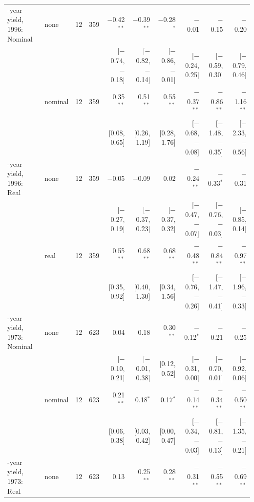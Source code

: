 \begin{table}[tp]
{\begin{tabular}{llcrrrrrrr}
\addlinespace
1-year yield, 1996: Nominal & none & 12 & 359 & $-$0.42$^{**}$ & $-$0.39$^{**}$ & $-$0.28$^{*}$ & $-$0.01 & $-$0.15 & $-$0.20\\
 & & & & {\scriptsize [$-$0.74, $-$0.18]} & {\scriptsize [$-$0.82, $-$0.14]} & {\scriptsize [$-$0.86, $-$0.01]} & {\scriptsize [$-$0.24, 0.25]} & {\scriptsize [$-$0.59, 0.30]} & {\scriptsize [$-$0.79, 0.46]}\\
 & nominal & 12 & 359 & 0.35$^{**}$ & 0.51$^{**}$ & 0.55$^{**}$ & $-$0.37$^{**}$ & $-$0.86$^{**}$ & $-$1.16$^{**}$\\
 & & & & {\scriptsize [0.08, 0.65]} & {\scriptsize [0.26, 1.19]} & {\scriptsize [0.28, 1.76]} & {\scriptsize [$-$0.68, $-$0.08]} & {\scriptsize [$-$1.48, $-$0.35]} & {\scriptsize [$-$2.33, $-$0.56]}\\
\addlinespace
1-year yield, 1996: Real & none & 12 & 359 & $-$0.05 & $-$0.09 & 0.02 & $-$0.24$^{**}$ & $-$0.33$^{*}$ & $-$0.31\\
 & & & & {\scriptsize [$-$0.27, 0.19]} & {\scriptsize [$-$0.37, 0.23]} & {\scriptsize [$-$0.37, 0.32]} & {\scriptsize [$-$0.47, $-$0.07]} & {\scriptsize [$-$0.76, $-$0.03]} & {\scriptsize [$-$0.85, 0.14]}\\
 & real & 12 & 359 & 0.55$^{**}$ & 0.68$^{**}$ & 0.68$^{**}$ & $-$0.48$^{**}$ & $-$0.84$^{**}$ & $-$0.97$^{**}$\\
 & & & & {\scriptsize [0.35, 0.92]} & {\scriptsize [0.40, 1.30]} & {\scriptsize [0.34, 1.56]} & {\scriptsize [$-$0.76, $-$0.26]} & {\scriptsize [$-$1.47, $-$0.41]} & {\scriptsize [$-$1.96, $-$0.33]}\\
\addlinespace
1-year yield, 1973: Nominal & none & 12 & 623 & 0.04 & 0.18 & 0.30$^{**}$ & $-$0.12$^{*}$ & $-$0.21 & $-$0.25\\
 & & & & {\scriptsize [$-$0.10, 0.21]} & {\scriptsize [$-$0.01, 0.38]} & {\scriptsize [0.12, 0.52]} & {\scriptsize [$-$0.31, 0.00]} & {\scriptsize [$-$0.70, 0.01]} & {\scriptsize [$-$0.92, 0.06]}\\
 & nominal & 12 & 623 & 0.21$^{**}$ & 0.18$^{*}$ & 0.17$^{*}$ & $-$0.14$^{**}$ & $-$0.34$^{**}$ & $-$0.50$^{**}$\\
 & & & & {\scriptsize [0.06, 0.38]} & {\scriptsize [0.03, 0.42]} & {\scriptsize [0.00, 0.47]} & {\scriptsize [$-$0.34, $-$0.03]} & {\scriptsize [$-$0.81, $-$0.13]} & {\scriptsize [$-$1.35, $-$0.21]}\\
\addlinespace
1-year yield, 1973: Real & none & 12 & 623 & 0.13 & 0.25$^{**}$ & 0.28$^{**}$ & $-$0.31$^{**}$ & $-$0.55$^{**}$ & $-$0.69$^{**}$\\

\end{tabular}}
\end{table}
